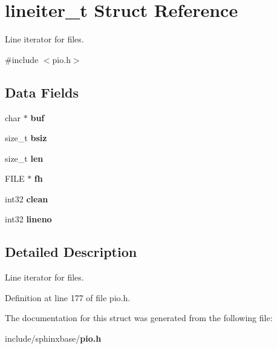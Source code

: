 \section{lineiter\-\_\-t Struct Reference}
\label{structlineiter__t}


Line iterator for files.  




{\ttfamily \#include $<$pio.\-h$>$}

\subsection*{Data Fields}
\begin{DoxyCompactItemize}
\item 
char $\ast$ {\bfseries buf}\label{structlineiter__t_a1bf482b3c2722af76102f7b4aae08e47}

\item 
size\-\_\-t {\bfseries bsiz}\label{structlineiter__t_ab9aef9582ea19e23370fab75981ae022}

\item 
size\-\_\-t {\bfseries len}\label{structlineiter__t_ad7faa6892d4a6d9e4e41c6d7dce4b590}

\item 
F\-I\-L\-E $\ast$ {\bfseries fh}\label{structlineiter__t_a08628d796a4850494f29f62dc0e55148}

\item 
int32 {\bfseries clean}\label{structlineiter__t_a800c26617f85d52aa4f3c8f6c3e6f96a}

\item 
int32 {\bfseries lineno}\label{structlineiter__t_ae8215b7dfb61b9718dab96c7c9d22311}

\end{DoxyCompactItemize}


\subsection{Detailed Description}
Line iterator for files. 

Definition at line 177 of file pio.\-h.



The documentation for this struct was generated from the following file\-:\begin{DoxyCompactItemize}
\item 
include/sphinxbase/{\bf pio.\-h}\end{DoxyCompactItemize}
